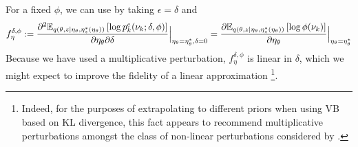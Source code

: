 For a fixed $\phi$, we can use  by taking
$\epsilon = \delta$ and
%
\begin{align*}
f^{\delta,\phi}_\eta :=
\frac{\partial^2
    \mathbb{E}_{q\left(\theta, z \vert \eta_\theta, \eta_z^{*}(\eta_\theta)\right)} \left[ \log p^c_{k}(\nu_k ; \delta, \phi) \right]}
{\partial \eta_\theta \partial \delta}
    \Big\rvert_{\eta_\theta = \eta_\theta^{*}, \delta = 0} =
\frac{\partial
    \mathbb{E}_{q\left(\theta, z \vert \eta_\theta, \eta_z^{*}(\eta_\theta)\right)} \left[ \log\phi(\nu_k) \right]}
{\partial \eta_\theta}
    \Big\rvert_{\eta_\theta = \eta_\theta^{*}}
\end{align*}
%
Because we have used a multiplicative perturbation, $f^{\delta,\phi}_\eta$
is linear in $\delta$, which we might expect to improve the fidelity of a
linear approximation
%
\footnote{Indeed, for the purposes of extrapolating to different priors
when using VB based on KL divergence, this
fact appears to recommend multiplicative perturbations amongst the class of
non-linear perturbations considered by \citet{gustafson:1996:localposterior}.}.
%
